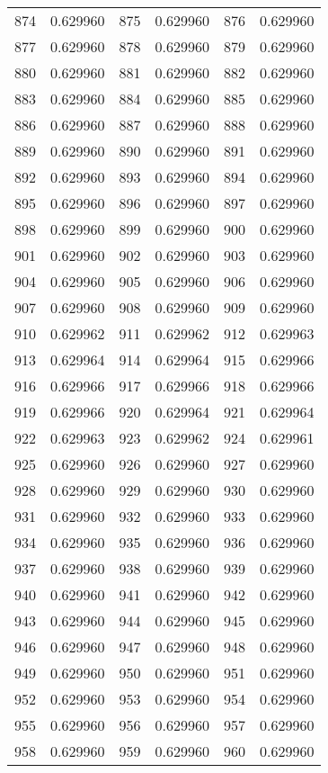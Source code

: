 \documentclass[12pt]{article}
\begin{document}
\begin{longtable}{@{}cc|cc|cc@{}}
874 & 0.629960 & 875 & 0.629960 & 876 & 0.629960 \\
877 & 0.629960 & 878 & 0.629960 & 879 & 0.629960 \\
880 & 0.629960 & 881 & 0.629960 & 882 & 0.629960 \\
883 & 0.629960 & 884 & 0.629960 & 885 & 0.629960 \\
886 & 0.629960 & 887 & 0.629960 & 888 & 0.629960 \\
889 & 0.629960 & 890 & 0.629960 & 891 & 0.629960 \\
892 & 0.629960 & 893 & 0.629960 & 894 & 0.629960 \\
895 & 0.629960 & 896 & 0.629960 & 897 & 0.629960 \\
898 & 0.629960 & 899 & 0.629960 & 900 & 0.629960 \\
901 & 0.629960 & 902 & 0.629960 & 903 & 0.629960 \\
904 & 0.629960 & 905 & 0.629960 & 906 & 0.629960 \\
907 & 0.629960 & 908 & 0.629960 & 909 & 0.629960 \\
910 & 0.629962 & 911 & 0.629962 & 912 & 0.629963 \\
913 & 0.629964 & 914 & 0.629964 & 915 & 0.629966 \\
916 & 0.629966 & 917 & 0.629966 & 918 & 0.629966 \\
919 & 0.629966 & 920 & 0.629964 & 921 & 0.629964 \\
922 & 0.629963 & 923 & 0.629962 & 924 & 0.629961 \\
925 & 0.629960 & 926 & 0.629960 & 927 & 0.629960 \\
928 & 0.629960 & 929 & 0.629960 & 930 & 0.629960 \\
931 & 0.629960 & 932 & 0.629960 & 933 & 0.629960 \\
934 & 0.629960 & 935 & 0.629960 & 936 & 0.629960 \\
937 & 0.629960 & 938 & 0.629960 & 939 & 0.629960 \\
940 & 0.629960 & 941 & 0.629960 & 942 & 0.629960 \\
943 & 0.629960 & 944 & 0.629960 & 945 & 0.629960 \\
946 & 0.629960 & 947 & 0.629960 & 948 & 0.629960 \\
949 & 0.629960 & 950 & 0.629960 & 951 & 0.629960 \\
952 & 0.629960 & 953 & 0.629960 & 954 & 0.629960 \\
955 & 0.629960 & 956 & 0.629960 & 957 & 0.629960 \\
958 & 0.629960 & 959 & 0.629960 & 960 & 0.629960 \\

\end{longtable}
\end{document}
